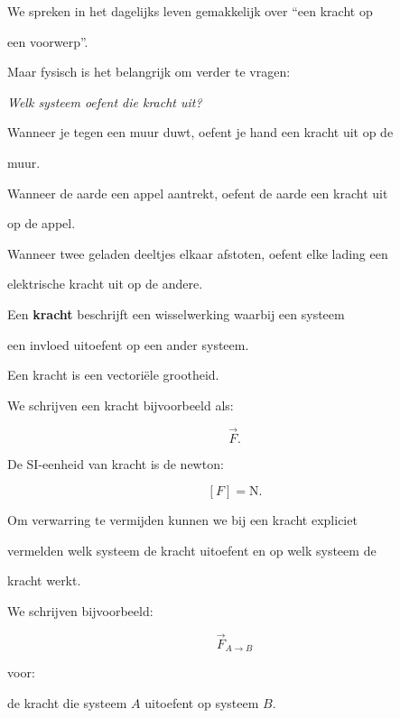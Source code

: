 \documentclass{ximera}
\begin{document}

We spreken in het dagelijks leven gemakkelijk over ``een kracht op

een voorwerp''.

Maar fysisch is het belangrijk om verder te vragen:

\begin{center}

\textit{Welk systeem oefent die kracht uit?}

\end{center}

Wanneer je tegen een muur duwt, oefent je hand een kracht uit op de

muur.

Wanneer de aarde een appel aantrekt, oefent de aarde een kracht uit

op de appel.

Wanneer twee geladen deeltjes elkaar afstoten, oefent elke lading een

elektrische kracht uit op de andere.


\begin{definitie}[Kracht]

Een \textbf{kracht} beschrijft een wisselwerking waarbij een systeem

een invloed uitoefent op een ander systeem.

Een kracht is een vectoriële grootheid.

\end{definitie}


We schrijven een kracht bijvoorbeeld als:

\[\vec F.\]

De SI-eenheid van kracht is de newton:

\[\boxed{ [F]=\mathrm N. }\]



Om verwarring te vermijden kunnen we bij een kracht expliciet

vermelden welk systeem de kracht uitoefent en op welk systeem de

kracht werkt.

We schrijven bijvoorbeeld:

\[\boxed{ \vec F_{A\rightarrow B} }\]

voor:

\begin{center}

de kracht die systeem $A$ uitoefent op systeem $B$.

\end{center}
\end{document}
